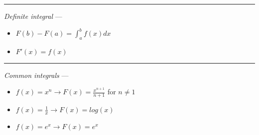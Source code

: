{\color{lightgray}\hrule height 0.001mm}

\emph{Definite integral} --- 
\begin{itemize}
    \item $F(b) - F(a) = \int_a^b f(x) dx$
    \item $F'(x) = f(x)$
\end{itemize}

{\color{lightgray}\hrule height 0.001mm}

\emph{Common integrals} --- 
\begin{itemize}
    \item $f(x) = x^n \rightarrow F(x) = \frac{x^{n+1}}{n+1}$ for $n \neq 1$
    \item $f(x) = \frac{1}{x} \rightarrow F(x) = log(x)$
    \item $f(x) = e^x \rightarrow F(x) = e^x$
\end{itemize}